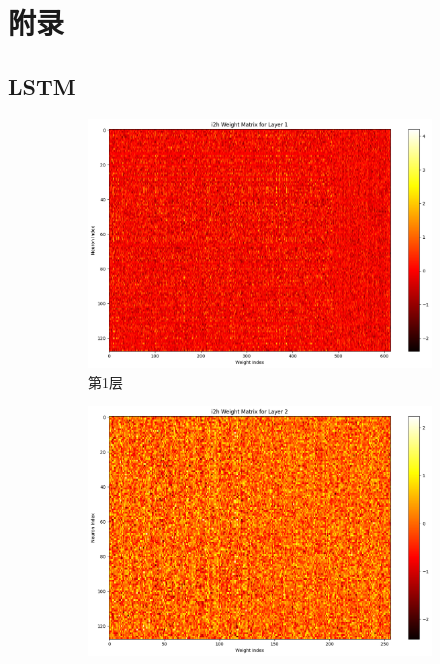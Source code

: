 \section{附录}

\subsection{LSTM}

\begin{figure}[H]
    \centering
    \begin{subfigure}{0.3\textwidth}
        \includegraphics[width=\linewidth]{../output/lstm/no scheduler/i2h Weight Matrix for Layer 1.png}
        \caption{第1层}
        \label{fig:lstmweightmatrixforlayer1noscheduler}
    \end{subfigure}
    \hfill
    \begin{subfigure}{0.3\textwidth}
        \includegraphics[width=\linewidth]{../output/lstm/no scheduler/i2h Weight Matrix for Layer 2.png}

\end{subfigure}
\end{figure}
